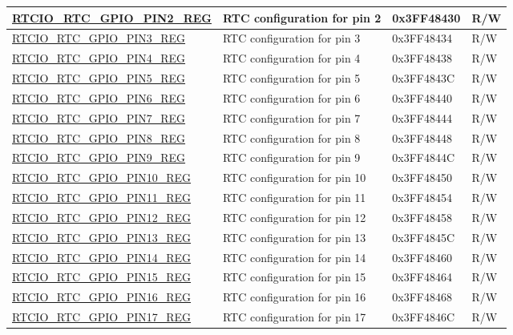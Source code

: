 \begin{longtable}{ | p{6.2cm} | p{6.8cm} | p{1.9cm} | p{1.1cm} | }
\hyperref[regdesc:RTCIORTCGPIOPINnREG]{RTCIO\_RTC\_GPIO\_PIN2\_REG} & RTC configuration for pin 2 & 0x3FF48430 & R/W \\ \hline
\hyperref[regdesc:RTCIORTCGPIOPINnREG]{RTCIO\_RTC\_GPIO\_PIN3\_REG} & RTC configuration for pin 3 & 0x3FF48434 & R/W \\ \hline
\hyperref[regdesc:RTCIORTCGPIOPINnREG]{RTCIO\_RTC\_GPIO\_PIN4\_REG} & RTC configuration for pin 4 & 0x3FF48438 & R/W \\ \hline
\hyperref[regdesc:RTCIORTCGPIOPINnREG]{RTCIO\_RTC\_GPIO\_PIN5\_REG} & RTC configuration for pin 5 & 0x3FF4843C & R/W \\ \hline
\hyperref[regdesc:RTCIORTCGPIOPINnREG]{RTCIO\_RTC\_GPIO\_PIN6\_REG} & RTC configuration for pin 6 & 0x3FF48440 & R/W \\ \hline
\hyperref[regdesc:RTCIORTCGPIOPINnREG]{RTCIO\_RTC\_GPIO\_PIN7\_REG} & RTC configuration for pin 7 & 0x3FF48444 & R/W \\ \hline
\hyperref[regdesc:RTCIORTCGPIOPINnREG]{RTCIO\_RTC\_GPIO\_PIN8\_REG} & RTC configuration for pin 8 & 0x3FF48448 & R/W\\ \hline
\hyperref[regdesc:RTCIORTCGPIOPINnREG]{RTCIO\_RTC\_GPIO\_PIN9\_REG} & RTC configuration for pin 9 & 0x3FF4844C & R/W \\ \hline
\hyperref[regdesc:RTCIORTCGPIOPINnREG]{RTCIO\_RTC\_GPIO\_PIN10\_REG} & RTC configuration for pin 10 & 0x3FF48450 & R/W \\ \hline
\hyperref[regdesc:RTCIORTCGPIOPINnREG]{RTCIO\_RTC\_GPIO\_PIN11\_REG} & RTC configuration for pin 11 & 0x3FF48454 & R/W \\ \hline
\hyperref[regdesc:RTCIORTCGPIOPINnREG]{RTCIO\_RTC\_GPIO\_PIN12\_REG} & RTC configuration for pin 12 & 0x3FF48458 & R/W \\ \hline
\hyperref[regdesc:RTCIORTCGPIOPINnREG]{RTCIO\_RTC\_GPIO\_PIN13\_REG} & RTC configuration for pin 13 & 0x3FF4845C & R/W \\ \hline
\hyperref[regdesc:RTCIORTCGPIOPINnREG]{RTCIO\_RTC\_GPIO\_PIN14\_REG} & RTC configuration for pin 14 & 0x3FF48460 & R/W \\ \hline
\hyperref[regdesc:RTCIORTCGPIOPINnREG]{RTCIO\_RTC\_GPIO\_PIN15\_REG} & RTC configuration for pin 15 & 0x3FF48464 & R/W \\ \hline
\hyperref[regdesc:RTCIORTCGPIOPINnREG]{RTCIO\_RTC\_GPIO\_PIN16\_REG} & RTC configuration for pin 16 & 0x3FF48468 & R/W\\ \hline
\hyperref[regdesc:RTCIORTCGPIOPINnREG]{RTCIO\_RTC\_GPIO\_PIN17\_REG} & RTC configuration for pin 17 & 0x3FF4846C & R/W \\ \hline

\end{longtable}

